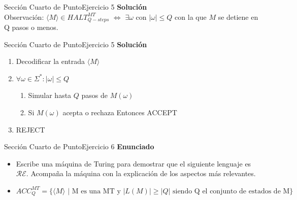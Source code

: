 \documentclass[10pt, envcountsect, presentation, aspectratio=169]{beamer}
\newcommand{\lr}{\ensuremath{\mathcal {RE}}}
\begin{document}

\begin{frame}{Sección Cuarto de Punto}{Ejercicio 5}
    \textbf{Solución}\\
    Observación: $\langle M \rangle \in HALT_{Q-steps}^{MT}$ $\Leftrightarrow$ $\exists \omega \text{ con } | \omega | \leq Q$ con la que $M$ se detiene en Q pasos o menos.\\
\end{frame}


\begin{frame}{Sección Cuarto de Punto}{Ejercicio 5}
    \textbf{Solución}\\
    \begin{enumerate}
        \item Decodificar la entrada $\langle M \rangle$
        \item $\forall \omega \in \Sigma^* : |\omega| \leq Q$
        \begin{enumerate}
            \item Simular hasta $Q$ pasos de $M(\omega)$
            \item Si $M(\omega)$ acepta o rechaza Entonces ACCEPT
        \end{enumerate}
        \item REJECT
    \end{enumerate}
\end{frame}


\begin{frame}{Sección Cuarto de Punto}{Ejercicio 6}
\textbf{Enunciado}
	\begin{itemize}
        \item Escribe una máquina de Turing para demostrar que el siguiente lenguaje es $\lr$. Acompaña la máquina con la explicación de los aspectos más relevantes. 
        \item[] $$ACC_{Q}^{MT}=\{\langle M \rangle \mbox{ | M es una MT y } |L(M)| \geq |Q| \mbox{ siendo Q el conjunto de estados de M}\}$$
    \end{itemize}
\end{frame}

\end{document}
